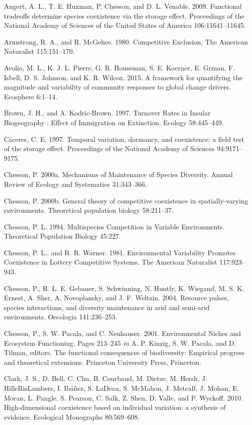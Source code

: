 \documentclass[12pt,]{article}
\begin{document}
Angert, A. L., T. E. Huxman, P. Chesson, and D. L. Venable. 2009.
Functional tradeoffs determine species coexistence via the storage
effect. Proceedings of the National Academy of Sciences of the United
States of America 106:11641--11645.

Armstrong, R. A., and R. McGehee. 1980. Competitive Exclusion. The
American Naturalist 115:151--170.

Avolio, M. L., K. J. L. Pierre, G. R. Houseman, S. E. Koerner, E. Grman,
F. Isbell, D. S. Johnson, and K. R. Wilcox. 2015. A framework for
quantifying the magnitude and variability of community responses to
global change drivers. Ecosphere 6:1--14.

Brown, J. H., and A. Kodric-Brown. 1997. Turnover Rates in Insular
Biogeography : Effect of Immigration on Extinction. Ecology 58:445--449.

C{á}ceres, C. E. 1997. Temporal variation, dormancy, and coexistence: a
field test of the storage effect. Proceedings of the National Academy of
Sciences 94:9171--9175.

Chesson, P. 2000a. Mechanisms of Maintenance of Species Diversity.
Annual Review of Ecology and Systematics 31:343--366.

Chesson, P. 2000b. General theory of competitive coexistence in
spatially-varying environments. Theoretical population biology
58:211--37.

Chesson, P. L. 1994. Multispecies Competition in Variable Environments.
Theoretical Population Biology 45:227.

Chesson, P. L., and R. R. Warner. 1981. Environmental Variability
Promotes Coexistence in Lottery Competitive Systems. The American
Naturalist 117:923--943.

Chesson, P., R. L. E. Gebauer, S. Schwinning, N. Huntly, K. Wiegand, M.
S. K. Ernest, A. Sher, A. Novoplansky, and J. F. Weltzin. 2004. Resource
pulses, species interactions, and diversity maintenance in arid and
semi-arid environments. Oecologia 141:236--253.

Chesson, P., S. W. Pacala, and C. Neuhauser. 2001. Environmental Niches
and Ecosystem Functioning. Pages 213--245 \emph{in} A. P. Kinzig, S. W.
Pacala, and D. Tilman, editors. The functional consequences of
biodiversity: Empirical progress and theoretical extensions. Princeton
University Press, Princeton.

Clark, J. S., D. Bell, C. Chu, B. Courbaud, M. Dietze, M. Hersh, J.
HilleRisLambers, I. Ib{á}{ñ}ez, S. LaDeau, S. McMahon, J. Metcalf, J.
Mohan, E. Moran, L. Pangle, S. Pearson, C. Salk, Z. Shen, D. Valle, and
P. Wyckoff. 2010. High-dimensional coexistence based on individual
variation: a synthesis of evidence. Ecological Monographs 80:569--608.
\end{document}
